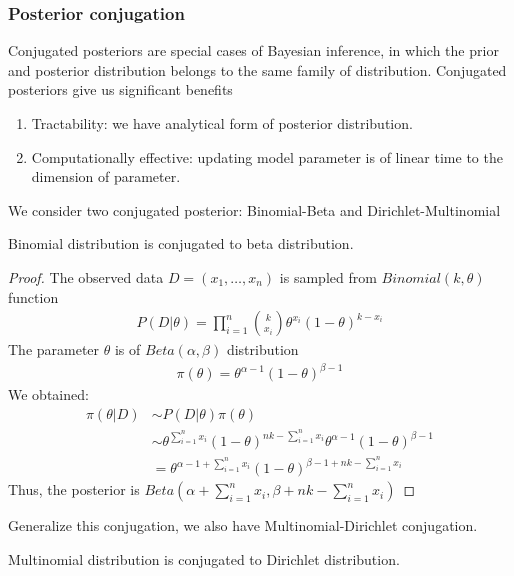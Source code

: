 \subsubsection{Posterior conjugation}
Conjugated posteriors are special cases of Bayesian inference, in which the
prior and posterior distribution belongs to the same family of distribution.
Conjugated posteriors give us significant benefits
\begin{enumerate}
      \item Tractability: we have analytical form of posterior distribution.
      \item Computationally effective: updating model parameter is of linear time to
            the dimension of parameter.
\end{enumerate}
We consider two conjugated posterior: Binomial-Beta and Dirichlet-Multinomial
\begin{lemma}
      Binomial distribution is conjugated to beta distribution.
\end{lemma}
\begin{proof}
      The observed data $D=(x_1,\ldots,x_n)$ is sampled from $Binomial(k, \theta)$ function
      \begin{align*}
            P(D|\theta) = \prod_{i=1}^n{k\choose x_i}\theta^{x_i}(1-\theta)^{k-x_i}
      \end{align*}
      The parameter $\theta$ is of $Beta(\alpha, \beta)$ distribution
      \begin{align*}
            \pi(\theta) = \theta^{\alpha-1}(1-\theta)^{\beta -1}
      \end{align*}
      We obtained:
      \begin{align*}
            \pi(\theta|D) & \sim P(D|\theta)\pi(\theta)                                                                             \\
                          & \sim \theta^{\sum_{i=1}^n x_i}(1-\theta)^{nk -\sum_{i=1}^n x_i} \theta^{\alpha -1} (1-\theta)^{\beta-1} \\
                          & = \theta^{\alpha - 1 + \sum_{i=1}^n x_i}(1-\theta)^{\beta - 1 + nk -\sum_{i=1}^n x_i}
      \end{align*}
      Thus, the posterior is $Beta(\alpha + \sum_{i=1}^n x_i, \beta + nk -\sum_{i=1}^n x_i)$
\end{proof}
Generalize this conjugation, we also have Multinomial-Dirichlet conjugation.
\begin{lemma}
      Multinomial distribution is conjugated to Dirichlet distribution.
\end{lemma}
